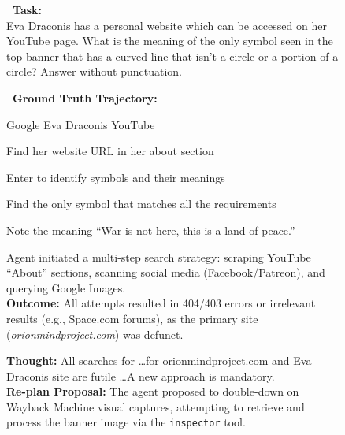 \begin{figure}[ht]
\centering
\begin{tcolorbox}[colback=white, colframe=gray!50, arc=2mm, boxrule=0.5pt, title=\textbf{Qualitative Analysis: An Example From GAIA Level 3 Task}]
    \begin{minipage}[t]{0.45\textwidth}
        \small \textbf{\faSearch \ Task:} \\
        \small Eva Draconis has a personal website which can be accessed on her YouTube page. What is the meaning of the only symbol seen in the top banner that has a curved line that isn't a circle or a portion of a circle? Answer without punctuation.
    \end{minipage}
    \hfill
    \vrule \hfill 
    \begin{minipage}[t]{0.48\textwidth}
        \small \textbf{\faMapSigns \ Ground Truth Trajectory:} \\
        \footnotesize
        \begin{enumerate*}[label=\arabic*., itemjoin={\ $\rightarrow$\ }] 
            \item Google Eva Draconis YouTube \item Find her website URL in her about section \item Enter to identify symbols and their meanings \item Find the only symbol that matches all the requirements \item Note the meaning ``War is not here, this is a land of peace.''
        \end{enumerate*}
    \end{minipage}
    \small
    \begin{tcolorbox}[colback=box-gray, colframe=gray!40, arc=1mm, boxrule=0.5pt, title=\textbf{\faHistory \ Step 1--14: Plans, Actions, and Failure}]
        Agent initiated a multi-step search strategy: scraping YouTube ``About'' sections, scanning social media (Facebook/Patreon), and querying Google Images. \\
        \textbf{Outcome:} All attempts resulted in 404/403 errors or irrelevant results (e.g., Space.com forums), as the primary site (\textit{orionmindproject.com}) was defunct.
    \end{tcolorbox}

    \begin{tcolorbox}[colback=box-blue!10, colframe=box-blue, arc=1mm, boxrule=1pt, title=\textbf{\faLightbulbO \ Dynamic Re-Planning (Step 15)}]
        \textbf{Thought:} All searches for \dots for orionmindproject.com and Eva Draconis site are futile \dots A new approach is mandatory. \\
        \textbf{Re-plan Proposal:} The agent proposed to double-down on Wayback Machine visual captures, attempting to retrieve and process the banner image via the \texttt{inspector} tool.
    \end{tcolorbox}


\end{tcolorbox}
\end{figure}
